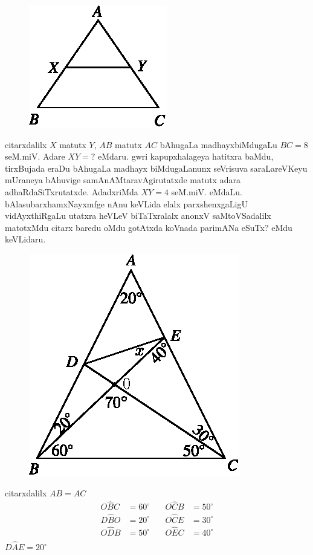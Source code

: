 \begin{figure}[H]
\centering
\includegraphics{src/figures/m_179d.eps}
\end{figure}
citarxdalilx $X$ matutx $Y$, $AB$ matutx $AC$ bAhugaLa madhayxbiMdugaLu $BC=8$ seM.miV. Adare $XY=?$ eMdaru. gwri kapupxhalageya hatitxra baMdu, tirxBujada eraDu bAhugaLa madhayx biMdugaLanunx seVrisuva saraLareVKeyu mUraneya bAhuvige samAnAMtaravAgirutatxde matutx adara adhaRdaSiTxrutatxde. AdadxriMda $XY=4$ seM.miV. eMdaLu. bAlasubarxhamxNayxmfge nAnu keVLida elalx parxshenxgaLigU vidAyxthiRgaLu utatxra heVLeV biTaTxralalx anonxV saMtoVSadalilx matotxMdu citarx baredu oMdu gotAtxda koVnada parimANa eSuTx? eMdu keVLidaru.
\begin{figure}[H]
\centering
\includegraphics{src/figures/m_181.eps}
\end{figure}

\begin{center} 
citarxdalilx $AB=AC$
$$
\begin{matrix}
O\widehat{B}C &=60^\circ & \quad  O\widehat{C}B &=50^\circ\\
D\widehat{B}O &=20^\circ & \quad O\widehat{C}E &=30^\circ\\
O\widehat{D}B &=50^\circ & \quad O\widehat{E}C & =40^\circ\\
\end{matrix}
$$
$D\widehat{A}E =20^\circ$
\end{center}

